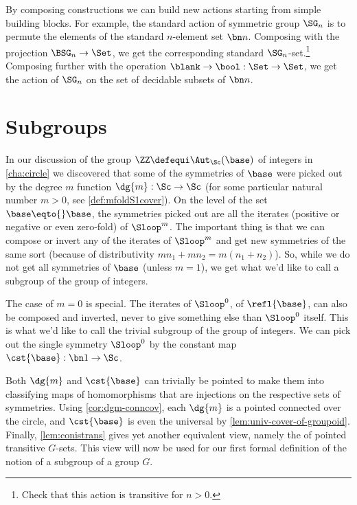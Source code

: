 \begin{example}
  By composing constructions we can build new actions
  starting from simple building blocks.
  For example, the standard action of symmetric group $\SG_n$
  is to permute the elements of the standard $n$-element set $\bn n$.
  Composing with the projection $\BSG_n \to \Set$,
  we get the corresponding standard $\SG_n$-set.\footnote{%
    Check that this action is transitive for $n>0$.}
  Composing further with the operation $\blank \to \bool : \Set \to \Set$,
  we get the action of $\SG_n$ on the set of decidable subsets of $\bn n$.
\end{example}

\section{Subgroups}
\label{sec:subgroups}
In our discussion of the group $\ZZ\defequi\Aut_{\Sc}(\base)$ of integers
in \cref{cha:circle} we discovered that some of the symmetries of $\base$
were picked out by the degree $m$ function $\dg{m}: \Sc\to\Sc$
(for some particular natural number $m>0$, see \cref{def:mfoldS1cover}).  
On the level of the set $\base\eqto{}\base$, the symmetries picked out are
all the iterates (positive or negative or even zero-fold) of $\Sloop^m$.
The important thing is that we can compose or invert any of the iterates
of $\Sloop^m$ and get new symmetries of the same sort (because of
distributivity $mn_1+mn_2=m(n_1+n_2)$). So, while we do not get all
symmetries of $\base$ (unless $m=1$), we get what we'd like to call 
a subgroup of the group of integers.

The case of $m=0$ is special. The iterates of $\Sloop^0$, \ie of
$\refl{\base}$, can also be composed and inverted, never to give
something else than $\Sloop^0$ itself. This is what we'd like to call
the trivial subgroup of the group of integers. 
We can pick out the single symmetry $\Sloop^0$
by the constant map $\cst{\base} : \bn 1 \to \Sc$.

Both $\dg{m}$ and $\cst{\base}$ can trivially be pointed to make them
into classifying maps of homomorphisms that are injections on the
respective sets of symmetries. Using \cref{cor:dgm-conncov},
each $\dg{m}$ is a pointed connected \covering over the circle, and
$\cst{\base}$ is even the universal \covering by 
\cref{lem:univ-cover-of-groupoid}. Finally, \cref{lem:conistrans}
gives yet another equivalent view, namely the of pointed transitive
$G$-sets. This view will now be used for our first formal definition
of the notion of a subgroup of a group $G$.

